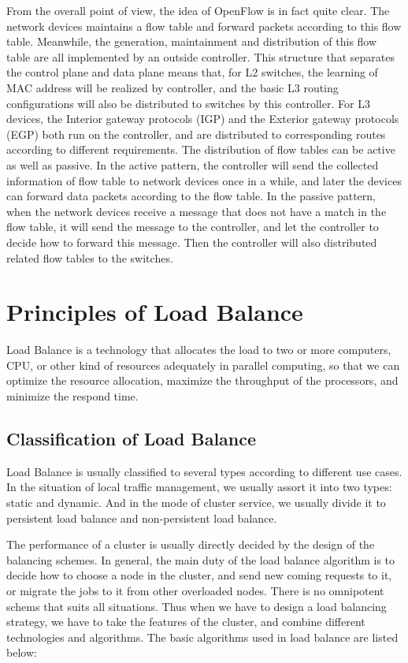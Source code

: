 From the overall point of view, the idea of OpenFlow is in fact quite clear. The network devices maintains a flow table and forward packets according to this flow table. Meanwhile, the generation, maintainment and distribution of this flow table are all implemented by an outside controller. This structure that separates the control plane and data plane means that, for L2 switches, the learning of MAC address will be realized by controller, and the basic L3 routing configurations will also be distributed to switches by this controller. For L3 devices, the Interior gateway protocols (IGP) and the Exterior gateway protocols (EGP) both run on the controller, and are distributed to corresponding routes according to different requirements. The distribution of flow tables can be active as well as passive. In the active pattern, the controller will send the collected information of flow table to network devices once in a while, and later the devices can forward data packets according to the flow table. In the passive pattern, when the network devices receive a message that does not have a match in the flow table, it will send the message to the controller, and let the controller to decide how to forward this message. Then the controller will also distributed related flow tables to the switches.

\section{Principles of Load Balance}
\label{sec:Principles of Load Balance}

Load Balance is a technology that allocates the load to two or more computers, CPU, or other kind of resources adequately in parallel computing, so that we can optimize the resource allocation, maximize the throughput of the processors, and minimize the respond time.

\subsection{Classification of Load Balance}
\label{sec:Classification of Load Balance}

Load Balance is usually classified to several types according to different use cases. In the situation of local traffic management, we usually assort it into two types: static and dynamic. And in the mode of cluster service, we usually divide it to persistent load balance and non-persistent load balance. 

The performance of a cluster is usually directly decided by the design of the balancing schemes. In general, the main duty of the load balance algorithm is to decide how to choose a node in the cluster, and send new coming requests to it, or migrate the jobs to it from other overloaded nodes. There is no omnipotent schems that suits all situations. Thus when we have to design a load balancing strategy, we have to take the features of the cluster, and combine different technologies and algorithms. The basic algorithms used in load balance are listed below:

